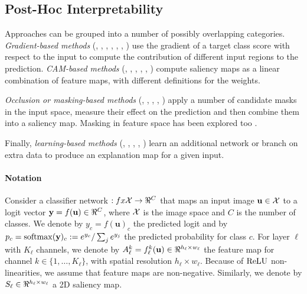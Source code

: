 \subsection{Post-Hoc Interpretability}
\label{rel:sub_post}

Approaches can be grouped into a number of possibly overlapping categories. 
\emph{Gradient-based methods} (\cite{adebayo2018local}, \cite{guidedbackprop}, 
\cite{baehrens2010explain}, \cite{simonyan2013deep}, \cite{smilkov2017smoothgrad}, 
\cite{bach2015pixel}, \cite{sundararajan2017axiomatic}) use the gradient of a target class score 
with respect to the input to compute the contribution of different input regions to the prediction. 
\emph{CAM-based methods} (\cite{wang2020score}, 
\cite{chattopadhay2018grad}, \cite{selvaraju2017grad}, 
\cite{axiombased}, \cite{jiang2021layercam}, \cite{ablationcam}) compute saliency maps 
as a linear combination of feature maps, with different definitions for the weights. 

\emph{Occlusion or masking-based methods} (\cite{petsiuk2018rise}, \cite{fong2017interpretable}, 
\cite{fong2019understanding}, \cite{schulz2020restricting}, \cite{ribeiro2016should}) apply a 
number of candidate masks in the input space, measure their effect on the prediction and then 
combine them into a saliency map. Masking in feature space has been explored too 
\autocite{schulz2020restricting}. 

Finally, \emph{learning-based methods} (\cite{chang2018explaining}, \cite{dabkowski2017real}, 
\cite{phang2020investigating}, \cite{zolna2020classifier}, \cite{schulz2020restricting}) learn an 
additional network or branch on extra data to produce an explanation map for a given input. 

\paragraph{Notation}
\label{sec:oc_notation}

Consider a classifier network $:fx \cX \to \real^C$ that maps an input image $\mathbf{u} \in \mathcal{X}$ to a 
logit vector $\vy = f(\mathbf{u}) \in \real^C$, where $\mathcal{X}$ is the image space and $C$ is the number 
of classes. We denote by $y_c = f(\mathbf{u})_c$ the predicted logit and by $p_c = \operatorname{softmax}(\mathbf{y})_c 
\mathrel{:=} e^{y_c} / \sum_j e^{y_j}$ the predicted probability for class $c$. For layer $\ell$ 
with $K_\ell$ channels, we denote by $A^k_\ell = f^k_\ell(\mathbf{u}) \in \real^{h_\ell \times w_\ell}$ 
the feature map for channel $k \in \{1,\dots,K_\ell\}$, with spatial resolution $h_\ell \times 
w_\ell$. Because of ${\operatorname{ReLU}}$ non-linearities, we assume that feature maps are non-negative. 
Similarly, we denote by $S_\ell \in \real^{h_\ell \times w_\ell}$ a 2D saliency map.

